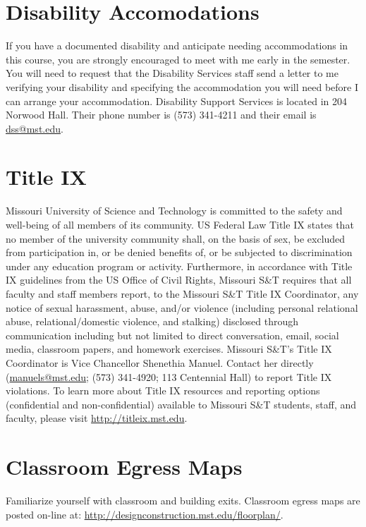 \documentclass{article}
\begin{document}
\section{Disability Accomodations}
If you have a documented disability and anticipate needing accommodations in this course, you are strongly encouraged to meet with me early in the semester.
You will need to request that the Disability Services staff send a letter to me verifying your disability and specifying the accommodation you will need before I can arrange your accommodation.
Disability Support Services is located in 204 Norwood Hall.
Their phone number is (573) 341-4211 and their email is \href{mailto:dss@mst.edu}{dss@mst.edu}.

\section{Title IX}
Missouri University of Science and Technology is committed to the safety and well-being of all members of its community.
US Federal Law Title IX states that no member of the university community shall, on the basis of sex, be excluded from participation in, or be denied benefits of, or be subjected to discrimination under any education program or activity.
Furthermore, in accordance with Title IX guidelines from the US Office of Civil Rights, Missouri S\&T requires that all faculty and staff members report, to the Missouri S\&T Title IX Coordinator, any notice of sexual harassment, abuse, and/or violence (including personal relational abuse, relational/domestic violence, and stalking) disclosed through communication including but not limited to direct conversation, email, social media, classroom papers, and homework exercises. Missouri S\&T’s Title IX Coordinator is Vice Chancellor Shenethia Manuel.
Contact her directly (\href{mailto:manuels@mst.edu}{manuels@mst.edu}; (573) 341-4920; 113 Centennial Hall) to report Title IX violations.
To learn more about Title IX resources and reporting options (confidential and non-confidential) available to Missouri S\&T students, staff, and faculty, please visit \href{http://titleix.mst.edu}{http://titleix.mst.edu}.

\section{Classroom Egress Maps}
Familiarize yourself with classroom and building exits. Classroom egress maps are posted on-line at: \href{http://designconstruction.mst.edu/floorplan/}{http://designconstruction.mst.edu/floorplan/}.
\end{document}
